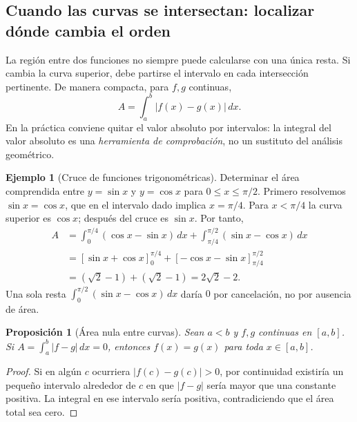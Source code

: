 \documentclass[12pt]{article}
\newtheorem{proposicion}[teorema]{Proposición}
\theoremstyle{definition}
\newtheorem{ejemplo}[teorema]{Ejemplo}
\theoremstyle{remark}
\begin{document}
\subsection*{Cuando las curvas se intersectan: localizar dónde cambia el orden}
La región entre dos funciones no siempre puede calcularse con una única resta. Si cambia la curva superior, debe partirse el intervalo en cada intersección pertinente. De manera compacta, para $f,g$ continuas,
\[
A=\int_a^b |f(x)-g(x)|\,dx.
\]
En la práctica conviene quitar el valor absoluto por intervalos: la integral del valor absoluto es una \emph{herramienta de comprobación}, no un sustituto del análisis geométrico.
\begin{ejemplo}[Cruce de funciones trigonométricas]
Determinar el área comprendida entre $y=\sin x$ y $y=\cos x$ para $0\le x\le\pi/2$. Primero resolvemos $\sin x=\cos x$, que en el intervalo dado implica $x=\pi/4$. Para $x<\pi/4$ la curva superior es $\cos x$; después del cruce es $\sin x$. Por tanto,
\begin{align*}
A&=\int_0^{\pi/4}(\cos x-\sin x)\,dx
+\int_{\pi/4}^{\pi/2}(\sin x-\cos x)\,dx\\
&=[\sin x+\cos x]_0^{\pi/4}
+[-\cos x-\sin x]_{\pi/4}^{\pi/2}\\
&=(\sqrt2-1)+(\sqrt2-1)
=\boxed{2\sqrt2-2}.
\end{align*}
Una sola resta $\int_0^{\pi/2}(\sin x-\cos x)\,dx$ daría $0$ por cancelación, no por ausencia de área.
\end{ejemplo}
\begin{proposicion}[Área nula entre curvas]
Sean $a<b$ y $f,g$ continuas en $[a,b]$. Si $A=\int_a^b|f-g|\,dx=0$, entonces $f(x)=g(x)$ para toda $x\in[a,b]$.
\end{proposicion}
\begin{proof}
Si en algún $c$ ocurriera $|f(c)-g(c)|>0$, por continuidad existiría un pequeño intervalo alrededor de $c$ en que $|f-g|$ sería mayor que una constante positiva. La integral en ese intervalo sería positiva, contradiciendo que el área total sea cero.
\end{proof}
\end{document}
